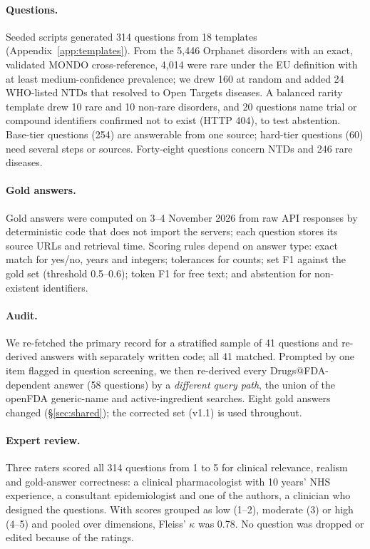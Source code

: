 \documentclass[11pt]{article}
\begin{document}
\paragraph{Questions.} Seeded scripts generated 314 questions from 18 templates (Appendix~\ref{app:templates}). From the 5,446 Orphanet disorders with an exact, validated MONDO cross-reference, 4,014 were rare under the EU definition with at least medium-confidence prevalence; we drew 160 at random and added 24 WHO-listed NTDs \citep{who_ntd} that resolved to Open Targets diseases. A balanced rarity template drew 10 rare and 10 non-rare disorders, and 20 questions name trial or compound identifiers confirmed not to exist (HTTP 404), to test abstention. Base-tier questions (254) are answerable from one source; hard-tier questions (60) need several steps or sources. Forty-eight questions concern NTDs and 246 rare diseases.

\paragraph{Gold answers.} Gold answers were computed on 3--4 November 2026 from raw API responses by deterministic code that does not import the servers; each question stores its source URLs and retrieval time. Scoring rules depend on answer type: exact match for yes/no, years and integers; tolerances for counts; set F1 against the gold set (threshold 0.5--0.6); token F1 for free text; and abstention for non-existent identifiers.

\paragraph{Audit.} We re-fetched the primary record for a stratified sample of 41 questions and re-derived answers with separately written code; all 41 matched. Prompted by one item flagged in question screening, we then re-derived every Drugs@FDA-dependent answer (58 questions) by a \emph{different query path}, the union of the openFDA generic-name and active-ingredient searches. Eight gold answers changed (\S\ref{sec:shared}); the corrected set (v1.1) is used throughout.

\paragraph{Expert review.} Three raters scored all 314 questions from 1 to 5 for clinical relevance, realism and gold-answer correctness: a clinical pharmacologist with 10 years' NHS experience, a consultant epidemiologist and one of the authors, a clinician who designed the questions. With scores grouped as low (1--2), moderate (3) or high (4--5) and pooled over dimensions, Fleiss' $\kappa$ was 0.78. No question was dropped or edited because of the ratings.
\end{document}
